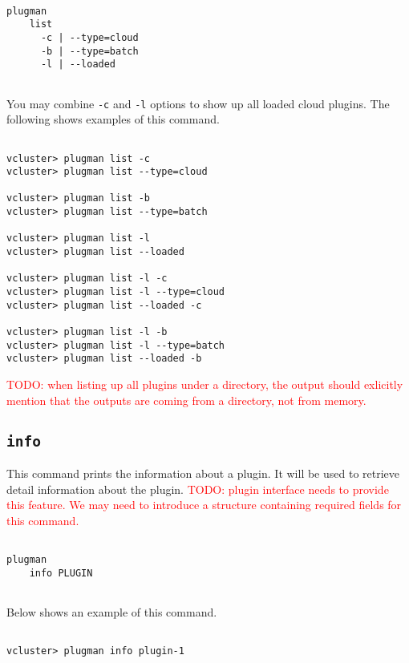 \documentclass[11pt]{article}
\def \ttt{\texttt}
\def \vb{\verb}
\begin{document}
\begin{Verbatim}[fontfamily=courier, fontsize = \small, obeytabs
=true, tabsize=4, frame=lines]

plugman 
    list
      -c | --type=cloud 
      -b | --type=batch
      -l | --loaded
      
\end{Verbatim}

You may combine \vb+-c+ and \vb+-l+ options to show up all loaded cloud plugins. The following shows examples of this command.

\begin{Verbatim}[fontfamily=courier, fontsize = \small, obeytabs
=true, tabsize=4, frame=lines]

vcluster> plugman list -c
vcluster> plugman list --type=cloud

vcluster> plugman list -b
vcluster> plugman list --type=batch

vcluster> plugman list -l
vcluster> plugman list --loaded

vcluster> plugman list -l -c
vcluster> plugman list -l --type=cloud
vcluster> plugman list --loaded -c

vcluster> plugman list -l -b
vcluster> plugman list -l --type=batch
vcluster> plugman list --loaded -b

\end{Verbatim}

\textcolor{red}{TODO: when listing up all plugins under a directory, the output should exlicitly mention that the outputs are coming from a directory, not from memory.}


\subsection{\ttt{info}}
This command prints the information about a plugin. It will be used to retrieve detail information about the plugin. \textcolor{red}{TODO: plugin interface needs to provide this feature. We may need to introduce a structure containing required fields for this command.}

\begin{Verbatim}[fontfamily=courier, fontsize = \small, obeytabs
=true, tabsize=4, frame=lines]

plugman 
    info PLUGIN
      
\end{Verbatim}

Below shows an example of this command.

\begin{Verbatim}[fontfamily=courier, fontsize = \small, obeytabs
=true, tabsize=4, frame=lines]

vcluster> plugman info plugin-1
      
\end{Verbatim}
\end{document}
